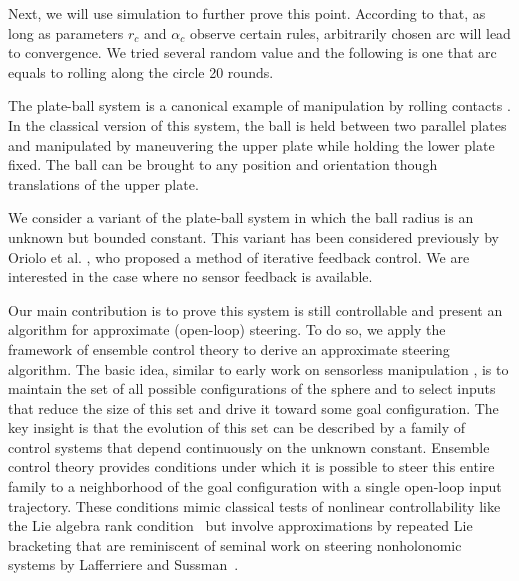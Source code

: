 \documentclass[letter paper, 10pt, conference]{ieeeconf}
\begin{document}
Next, we will use simulation to further prove this point. According to that, as long as parameters $r_c$ and $\alpha_c$ observe certain rules, arbitrarily chosen arc will lead to convergence. We tried several random value and the following is one that arc equals to rolling along the circle 20 rounds.

The plate-ball system is a canonical example of manipulation by rolling contacts \cite{Brockett1993}. In the classical version of this system, the ball is held between two parallel plates and manipulated by maneuvering the upper plate while holding the lower plate fixed.  The ball can be brought to any position and orientation though translations of the upper plate.

 We consider a variant of the plate-ball system in which the ball radius is an unknown but bounded constant. This variant has been considered previously by Oriolo et al. \cite{Oriolo2005}, who proposed a method of iterative feedback control. We are interested in the case where no sensor feedback is available.
 
 Our main contribution is to prove this system is still controllable and present an algorithm for approximate (open-loop) steering.  To do so, we apply the framework of ensemble control theory \cite{Brockett1999,Li2009,Li2011,Becker2012} to derive an approximate  %
steering algorithm. %
The basic idea, similar to early work on sensorless manipulation \cite{Erdmann1988}, is to maintain the set of all possible configurations of the sphere and to select inputs that reduce the size of this set and drive it toward some goal configuration. The key insight is that the evolution of this set can be described by a family of control systems that depend continuously on the unknown constant. Ensemble control theory provides conditions under which it is possible to steer this entire family to a neighborhood of the goal configuration with a single open-loop input trajectory. These conditions mimic classical tests of nonlinear controllability like
the Lie algebra rank condition~\cite{Sussmann1972}
but involve approximations by repeated Lie bracketing that are reminiscent of seminal work on steering nonholonomic systems by Lafferriere and Sussman~\cite{Lafferriere1993}.
\end{document}
